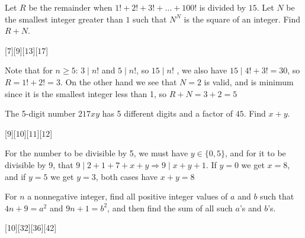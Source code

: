 \begin{problem}
    Let $R$ be the remainder when $1! + 2! + 3! + \dots + 100!$ is divided by $15$. Let $N$ be the smallest integer greater than $1$ such that $N^N$ is the square of an integer. Find $R + N$.
\end{problem}

[$7$][$9$][$13$][$17$]

\begin{solution}[A]
    Note that for $n\geq 5$: $3 \mid n!$ and $5\mid n!$, so $15 \mid n!$ , we also have $15 \mid 4!+3! = 30$, so $R=1!+2!=3$. On the other hand we see that $N=2$ is valid, and is minimum since it is the smallest integer less than 1, so $R+N=3+2=\boxed{5}$
\end{solution}

\begin{problem}
    The 5-digit number $217xy$ has 5 different digits and a factor of $45$. Find $x + y$.
\end{problem}

[$9$][$10$][$11$][$12$]

\begin{solution}[A]
     For the number to be divisible by 5, we must have $y\in \{0,5\}$, and for it to be divisible by 9, that $9 \mid 2+1+7+x+y \Rightarrow 9 \mid x+y+1$. If $y=0$ we get $x=8$, and if $y=5$ we get $y=3$, both cases have $x+y=\boxed{8}$
\end{solution}

\begin{problem}
    For $n$ a nonnegative integer, find all positive integer values of $a$ and $b$ such that $4n + 9 = a^2$ and $9n + 1 = b^2$, and then find the sum of all such $a$’s and $b$’s.
\end{problem}

[10][32][36][42]

